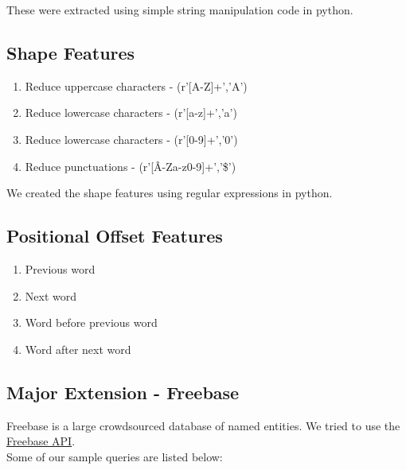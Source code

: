 \documentclass[a4paper]{article}
\begin{document}
These were extracted using simple string manipulation code in python. 

\subsection{Shape Features}
\begin{enumerate}
\item Reduce uppercase characters - (r'[A-Z]+','A')
\item Reduce lowercase characters - (r'[a-z]+','a')
\item Reduce lowercase characters - (r'[0-9]+','0')
\item Reduce punctuations - (r'[\^A-Za-z0-9]+','\$')
\end{enumerate}

We created the shape features using regular expressions in python. 

\subsection{Positional Offset Features}
\begin{enumerate}
\item Previous word
\item Next word
\item Word before previous word
\item Word after next word
\end{enumerate}

\subsection{Major Extension - Freebase}

Freebase is a large crowdsourced database of named entities. We tried to use the \href{https://developers.google.com/freebase/v1/search}{Freebase API}. \\

Some of our sample queries are listed below: \\
\end{document}
